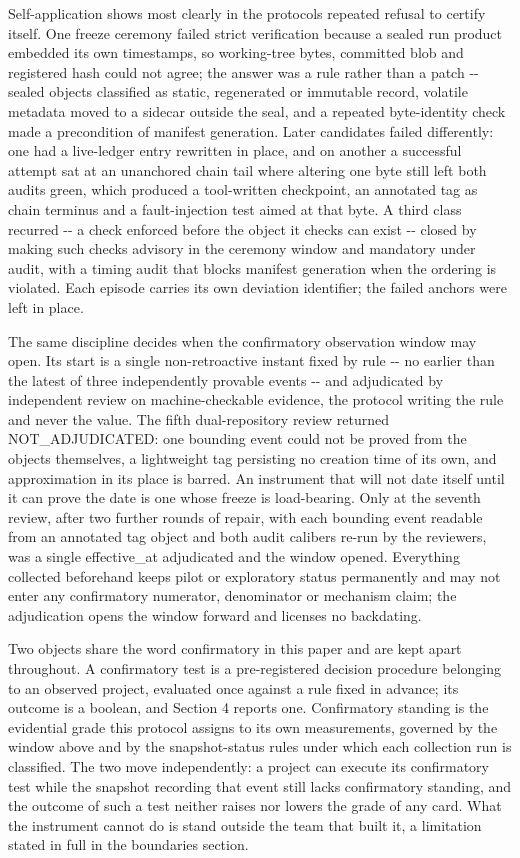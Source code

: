 \documentclass[
  english,
]{article}
\begin{document}
Self-application shows most clearly in the protocol\textquotesingle s repeated refusal to certify itself. One freeze ceremony failed strict verification because a sealed run product embedded its own timestamps, so working-tree bytes, committed blob and registered hash could not agree; the answer was a rule rather than a patch -\/- sealed objects classified as static, regenerated or immutable record, volatile metadata moved to a sidecar outside the seal, and a repeated byte-identity check made a precondition of manifest generation. Later candidates failed differently: one had a live-ledger entry rewritten in place, and on another a successful attempt sat at an unanchored chain tail where altering one byte still left both audits green, which produced a tool-written checkpoint, an annotated tag as chain terminus and a fault-injection test aimed at that byte. A third class recurred -\/- a check enforced before the object it checks can exist -\/- closed by making such checks advisory in the ceremony window and mandatory under audit, with a timing audit that blocks manifest generation when the ordering is violated. Each episode carries its own deviation identifier; the failed anchors were left in place.

The same discipline decides when the confirmatory observation window may open. Its start is a single non-retroactive instant fixed by rule -\/- no earlier than the latest of three independently provable events -\/- and adjudicated by independent review on machine-checkable evidence, the protocol writing the rule and never the value. The fifth dual-repository review returned NOT\_ADJUDICATED: one bounding event could not be proved from the objects themselves, a lightweight tag persisting no creation time of its own, and approximation in its place is barred. An instrument that will not date itself until it can prove the date is one whose freeze is load-bearing. Only at the seventh review, after two further rounds of repair, with each bounding event readable from an annotated tag object and both audit calibers re-run by the reviewers, was a single effective\_at adjudicated and the window opened. Everything collected beforehand keeps pilot or exploratory status permanently and may not enter any confirmatory numerator, denominator or mechanism claim; the adjudication opens the window forward and licenses no backdating.

Two objects share the word confirmatory in this paper and are kept apart throughout. A confirmatory test is a pre-registered decision procedure belonging to an observed project, evaluated once against a rule fixed in advance; its outcome is a boolean, and Section 4 reports one. Confirmatory standing is the evidential grade this protocol assigns to its own measurements, governed by the window above and by the snapshot-status rules under which each collection run is classified. The two move independently: a project can execute its confirmatory test while the snapshot recording that event still lacks confirmatory standing, and the outcome of such a test neither raises nor lowers the grade of any card. What the instrument cannot do is stand outside the team that built it, a limitation stated in full in the boundaries section.
\end{document}
